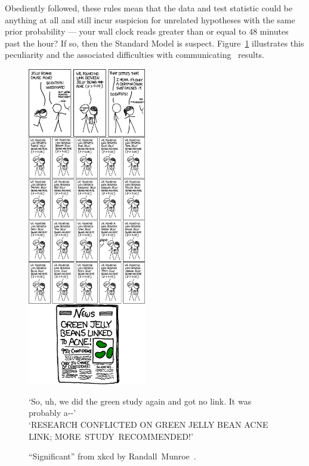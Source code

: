 Obediently followed, these rules mean that the data and test statistic could be
anything at all and still incur suspicion for unrelated hypotheses with the
same prior probability ---
your wall clock reads greater than or equal to $48$ minutes past the hour?
If so, then the Standard Model is suspect.
Figure~\ref{fig:searches_significant} illustrates this peculiarity and the
associated difficulties with communicating \pvalue\ results.

\begin{figure}[tp]
\centering
\includegraphics[width=0.46\textwidth]{figures/searches_significant_shrink.png}
\\
\begin{footnotesize}
`So, uh, we did the green study again and got no link. It was probably a{-}{-}'
\\
`RESEARCH CONFLICTED ON GREEN JELLY BEAN ACNE LINK; MORE~STUDY~RECOMMENDED!'
\end{footnotesize}
\caption[
``Significant'' from xkcd by Randall~Munroe
]{%
``Significant'' from xkcd by Randall~Munroe~\cite{xkcd2011significant}.
}
\label{fig:searches_significant}
\end{figure}

